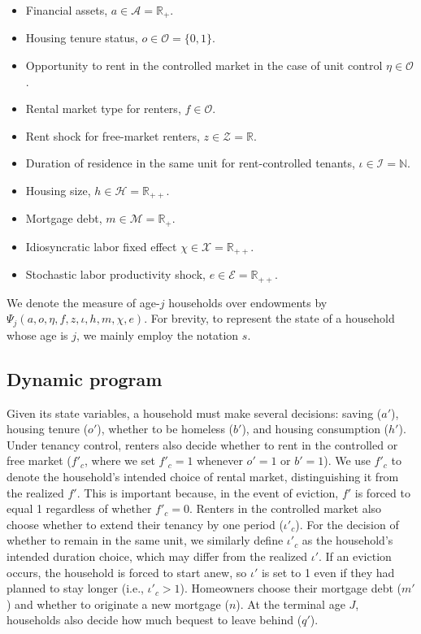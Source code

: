 \documentclass[parskip=full]{article}
\begin{document}
\begin{itemize}
    \item Financial assets, $a\in \mathcal{A}=\mathbb{R}_{+}$.
    \item Housing tenure status, $o \in \mathcal{O}=\{0,1\}$.
    \item Opportunity to rent in the controlled market in the case of unit control $\eta \in \mathcal{O}$.
    \item Rental market type for renters, $f \in \mathcal{O}$.
    \item Rent shock for free-market renters, $z \in \mathcal{Z}={\mathbb{R}}$.
    \item Duration of residence in the same unit for rent-controlled tenants, $\iota \in \mathcal{I}=\mathbb{N}$.
    \item Housing size, $h\in \mathcal{H}=\mathbb{R}_{++}$.
    \item Mortgage debt, $m \in \mathcal{M}=\mathbb{R}_{+}$.
    \item Idiosyncratic labor fixed effect $\chi \in \mathcal{X}=\mathbb{R}_{++}$.
    \item Stochastic labor productivity shock, $e \in \mathcal{E} = \mathbb{R}_{++}$.
\end{itemize}
 
\noindent We denote the measure of age-$j$ households over endowments by $\Psi_{j}(a,o,\eta,f,z,\iota,h,m,\chi,e)$. For brevity, to represent the state of a household whose age is $j$, we mainly employ the notation $s$.

\subsection{Dynamic program}\label{subsection:household_optimization}
Given its state variables, a household must make several decisions: saving ($a'$), housing tenure ($o'$), whether to be homeless ($b'$), and housing consumption ($h'$). Under tenancy control, renters also decide whether to rent in the controlled or free market ($f'_{c}$, where we set $f'_{c}=1$ whenever $o'=1$ or $b'=1$). We use $f'_c$ to denote the household's intended choice of rental market, distinguishing it from the realized $f'$. This is important because, in the event of eviction, $f'$ is forced to equal 1 regardless of whether $f'_c=0$.
Renters in the controlled market also choose whether to extend their tenancy by one period ($\iota'_c$). For the decision of whether to remain in the same unit, we similarly define $\iota'_c$ as the household's intended duration choice, which may differ from the realized $\iota'$. If an eviction occurs, the household is forced to start anew, so $\iota'$ is set to 1 even if they had planned to stay longer (i.e., $\iota'_c > 1$). Homeowners choose their mortgage debt ($m'$) and whether to originate a new mortgage ($n$). At the terminal age $J$, households also decide how much bequest to leave behind ($q'$).
\end{document}
